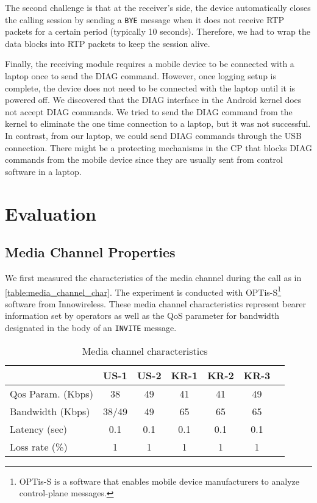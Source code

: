 The second challenge is that at the receiver's side, the device automatically closes the calling session by
sending a {\tt BYE} message when it
does not receive RTP packets for a certain period (typically 10 seconds).
Therefore, we had to wrap the data blocks into RTP packets to keep
the session alive.

Finally, the receiving module requires a mobile device to be connected with a
laptop once to send the DIAG command. However, once logging setup is
complete, the device does not need to be connected with the laptop
until it is powered off. We discovered that the DIAG interface in the Android
kernel does not accept DIAG commands.
 We tried to send the DIAG command from the kernel to eliminate the one time connection to a
laptop, but it was not successful.
In contrast, from our laptop, we could send DIAG commands through the USB connection.
There might be a protecting mechanisms in the CP that blocks DIAG commands from the
mobile device since they are usually sent from control software in a laptop.


\section{Evaluation}
\label{sec:eval}


\subsection{Media Channel Properties}
\label{sec:chann_charac}
We first measured the characteristics of the media channel during the call as in
\autoref{table:media_channel_char}.  The experiment is conducted with
OPTis-S\footnote{OPTis-S is a software that enables
mobile device manufacturers to analyze control-plane messages.} software from
Innowireless. These media channel characteristics represent bearer information
set by operators as well as the QoS parameter for bandwidth designated in the
body of an {\tt INVITE} message.

\begin{table}[h]
  \caption{Media channel characteristics}
  \label{table:media_channel_char}
  \renewcommand{\arraystretch}{1.4}
  \renewcommand{\tabcolsep}{1.2mm}
  \centering
  \begin{tabular}{l| c c c c c c}
    \hline
    & \bf{US-1} & \bf{US-2} & \bf{KR-1} & \bf{KR-2} & \bf{KR-3} \\
    \hline\hline
    Qos Param. (Kbps) & 38 & 49 & 41 & 41 & 49 \\
    Bandwidth (Kbps) & 38/49 & 49 & 65 & 65 & 65  \\
    Latency (sec) & 0.1& 0.1 & 0.1& 0.1 & 0.1 \\
    Loss rate (\%) & 1& 1& 1& 1 & 1  \\
    \hline
  \end{tabular}
\end{table}

